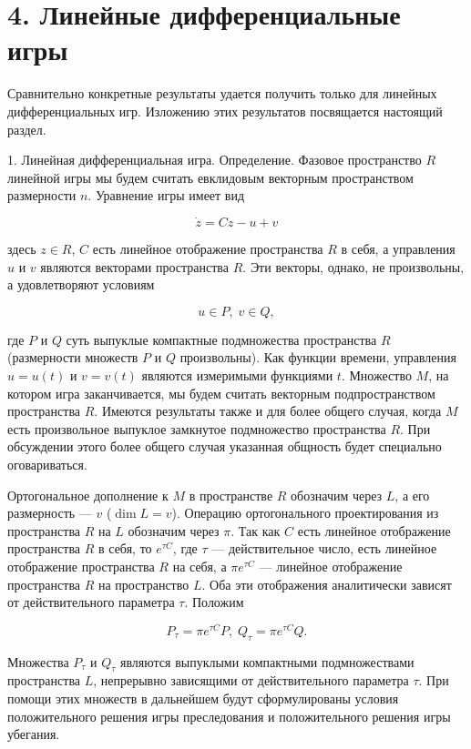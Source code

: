 \documentclass[10pt]{article}
\begin{document}
\section*{4. Линейные дифференциальные игры}

Сравнительно конкретные результаты удается получить только для линейных дифференциальных игр. Изложению этих результатов посвящается настоящий раздел.

1. Линейная дифференциальная игра. Определение. Фазовое пространство \(R\) линейной игры мы будем считать евклидовым векторным пространством размерности \(n\). Уравнение игры имеет вид

\[
\dot{z} = {Cz} - u + v \tag{1}
\]

здесь \(z \in  R\), \(C\) есть линейное отображение пространства \(R\) в себя, а управления \(u\) и \(v\) являются векторами пространства \(R\). Эти векторы, однако, не произвольны, а удовлетворяют условиям

\[
u \in  P,\;v \in  Q, \tag{2}
\]

где \(P\) и \(Q\) суть выпуклые компактные подмножества пространства \(R\) (размерности множеств \(P\) и \(Q\) произвольны). Как функции времени, управления \(u = u\left( t\right)\) и \(v = v\left( t\right)\) являются измеримыми функциями \(t\). Множество \(M\), на котором игра заканчивается, мы будем считать векторным подпространством пространства \(R\). Имеются результаты также и для более общего случая, когда \(M\) есть произвольное выпуклое замкнутое подмножество пространства \(R\). При обсуждении этого более общего случая указанная общность будет специально оговариваться.

Ортогональное дополнение к \(M\) в пространстве \(R\) обозначим через \(L\), а его размерность — \(v\) (\(\dim L = v\)). Операцию ортогонального проектирования из пространства \(R\) на \(L\) обозначим через \(\pi\). Так как \(C\) есть линейное отображение пространства \(R\) в себя, то \(e^{\tau C}\), где \(\tau\) — действительное число, есть линейное отображение пространства \(R\) на себя, а \(\pi {e}^{\tau C}\) — линейное отображение пространства \(R\) на пространство \(L\). Оба эти отображения аналитически зависят от действительного параметра \(\tau\). Положим

\[
{P}_{\tau } = \pi {e}^{\tau C}P,\;{Q}_{\tau } = \pi {e}^{\tau C}Q. \tag{3}
\]

Множества \({P}_{\tau }\) и \({Q}_{\tau }\) являются выпуклыми компактными подмножествами пространства \(L\), непрерывно зависящими от действительного параметра \(\tau\). При помощи этих множеств в дальнейшем будут сформулированы условия положительного решения игры преследования и положительного решения игры убегания.
\end{document}

